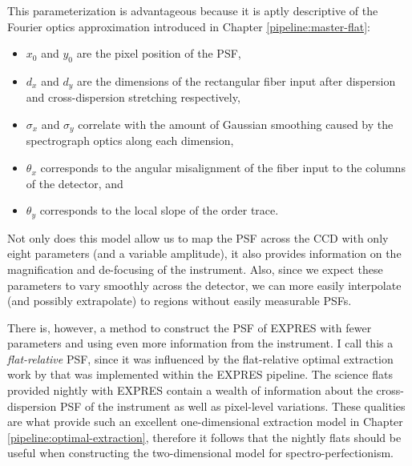 This parameterization is advantageous because it is aptly descriptive of the Fourier optics approximation introduced in Chapter \ref{pipeline:master-flat}:
\begin{itemize}
    \item $x_0$ and $y_0$ are the pixel position of the PSF,
    \item $d_x$ and $d_y$ are the dimensions of the rectangular fiber input after dispersion and cross-dispersion stretching respectively,
    \item $\sigma_x$ and $\sigma_y$ correlate with the amount of Gaussian smoothing caused by the spectrograph optics along each dimension,
    \item $\theta_x$ corresponds to the angular misalignment of the fiber input to the columns of the detector, and
    \item $\theta_y$ corresponds to the local slope of the order trace.
\end{itemize}
Not only does this model allow us to map the PSF across the CCD with only eight parameters (and a variable amplitude), it also provides information on the magnification and de-focusing of the instrument. Also, since we expect these parameters to vary smoothly across the detector, we can more easily interpolate (and possibly extrapolate) to regions without easily measurable PSFs.

There is, however, a method to construct the PSF of EXPRES with fewer parameters and using even more information from the instrument. I call this a \textit{flat-relative} PSF, since it was influenced by the flat-relative optimal extraction work by \citet{zechmeister_flat-relative_2014} that was implemented within the EXPRES pipeline. The science flats provided nightly with EXPRES contain a wealth of information about the cross-dispersion PSF of the instrument as well as pixel-level variations. These qualities are what provide such an excellent one-dimensional extraction model in Chapter \ref{pipeline:optimal-extraction}, therefore it follows that the nightly flats should be useful when constructing the two-dimensional model for spectro-perfectionism.

